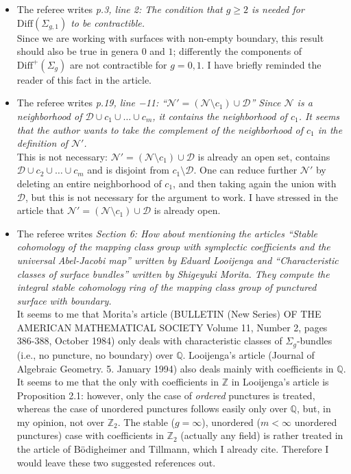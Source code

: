 \documentclass{amsart}
\begin{document}
\begin{itemize}
 \item The referee writes \emph{p.3, line 2: The condition that $g\geq 2$ is needed for $\mathrm{Diff}(\Sigma_{g,1})$ to be contractible.}\\
 Since we are working with surfaces with non-empty boundary, this result should also be true in genera $0$ and $1$; differently
 the components of $\mathrm{Diff}^+(\Sigma_g)$ are not contractible for $g=0,1$. I have briefly reminded the reader of this fact in the article.
 \item The referee writes \emph{p.19, line −11: ``$\mathcal{N}' = (\mathcal{N} \setminus c_1 ) \cup \mathcal{D}$''
 Since $\mathcal{N}$ is a neighborhood of $\mathcal{D} \cup c_1 \cup\dots\cup c_m$, it contains the neighborhood of
 $c_1$. It seems that the author wants to take the complement of the neighborhood
 of $c_1$ in the definition of $\mathcal{N}'$.}\\
 This is not necessary: $\mathcal{N}' = (\mathcal{N} \setminus c_1 ) \cup \mathcal{D}$ is already an open set, contains
 $\mathcal{D} \cup c_2 \cup\dots\cup c_m$ and is disjoint from $c_1\setminus\mathcal{D}$. One can reduce further
 $\mathcal{N}'$ by deleting an entire neighborhood of $c_1$, and then taking again the union with $\mathcal{D}$, but
 this is not necessary for the argument to work. I have stressed in the article that $\mathcal{N}' = (\mathcal{N} \setminus c_1 ) \cup \mathcal{D}$
 is already open.
 \item The referee writes \emph{Section 6: How about mentioning the articles ``Stable cohomology of the mapping
 class group with symplectic coefficients and the universal Abel-Jacobi map'' written by Eduard Looijenga
 and ``Characteristic classes of surface bundles'' written
 by Shigeyuki Morita. They compute the integral stable cohomology ring of the
 mapping class group of punctured surface with boundary.}\\
 It seems to me that Morita's article (BULLETIN   (New  Series)  OF  THE  AMERICAN  MATHEMATICAL   SOCIETY
 Volume  11,  Number  2, pages 386-388,  October   1984) only deals with characteristic classes of
 $\Sigma_g$-bundles (i.e., no puncture, no boundary) over $\mathbb{Q}$. Looijenga's article
 (Journal of Algebraic Geometry. 5. January 1994) also deals mainly with coefficients in $\mathbb{Q}$.
 It seems to me that the only with coefficients in $\mathbb{Z}$ in Looijenga's article is Proposition 2.1:
 however, only the case of \emph{ordered} punctures is treated, whereas the case of unordered
 punctures follows easily only over $\mathbb{Q}$, but, in my opinion, not over $\mathbb{Z}_2$.
 The stable ($g=\infty$), unordered ($m<\infty$ unordered punctures) case with coefficients
 in $\mathbb{Z}_2$ (actually any field) is rather treated in the article of B\"odigheimer and Tillmann,
 which I already cite. Therefore I would leave these two suggested references out. 
\end{itemize}
\end{document}
